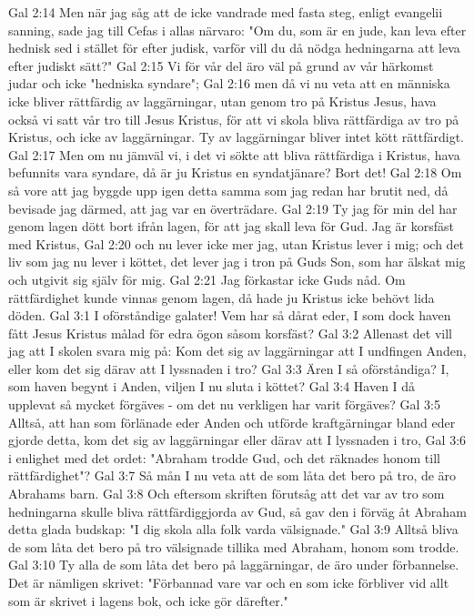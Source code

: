 Gal 2:14  Men när jag såg att de icke vandrade med fasta steg, enligt evangelii sanning, sade jag till Cefas i allas närvaro: "Om du, som är en jude, kan leva efter hednisk sed i stället för efter judisk, varför vill du då nödga hedningarna att leva efter judiskt sätt?"
Gal 2:15  Vi för vår del äro väl på grund av vår härkomst judar och icke "hedniska syndare";
Gal 2:16  men då vi nu veta att en människa icke bliver rättfärdig av laggärningar, utan genom tro på Kristus Jesus, hava också vi satt vår tro till Jesus Kristus, för att vi skola bliva rättfärdiga av tro på Kristus, och icke av laggärningar. Ty av laggärningar bliver intet kött rättfärdigt.
Gal 2:17  Men om nu jämväl vi, i det vi sökte att bliva rättfärdiga i Kristus, hava befunnits vara syndare, då är ju Kristus en syndatjänare? Bort det!
Gal 2:18  Om så vore att jag byggde upp igen detta samma som jag redan har brutit ned, då bevisade jag därmed, att jag var en överträdare.
Gal 2:19  Ty jag för min del har genom lagen dött bort ifrån lagen, för att jag skall leva för Gud. Jag är korsfäst med Kristus,
Gal 2:20  och nu lever icke mer jag, utan Kristus lever i mig; och det liv som jag nu lever i köttet, det lever jag i tron på Guds Son, som har älskat mig och utgivit sig själv för mig.
Gal 2:21  Jag förkastar icke Guds nåd. Om rättfärdighet kunde vinnas genom lagen, då hade ju Kristus icke behövt lida döden.
Gal 3:1  I oförståndige galater! Vem har så dårat eder, I som dock haven fått Jesus Kristus målad för edra ögon såsom korsfäst?
Gal 3:2  Allenast det vill jag att I skolen svara mig på: Kom det sig av laggärningar att I undfingen Anden, eller kom det sig därav att I lyssnaden i tro?
Gal 3:3  Ären I så oförståndiga? I, som haven begynt i Anden, viljen I nu sluta i köttet?
Gal 3:4  Haven I då upplevat så mycket förgäves - om det nu verkligen har varit förgäves?
Gal 3:5  Alltså, att han som förlänade eder Anden och utförde kraftgärningar bland eder gjorde detta, kom det sig av laggärningar eller därav att I lyssnaden i tro,
Gal 3:6  i enlighet med det ordet: "Abraham trodde Gud, och det räknades honom till rättfärdighet"?
Gal 3:7  Så mån I nu veta att de som låta det bero på tro, de äro Abrahams barn.
Gal 3:8  Och eftersom skriften förutsåg att det var av tro som hedningarna skulle bliva rättfärdiggjorda av Gud, så gav den i förväg åt Abraham detta glada budskap: "I dig skola alla folk varda välsignade."
Gal 3:9  Alltså bliva de som låta det bero på tro välsignade tillika med Abraham, honom som trodde.
Gal 3:10  Ty alla de som låta det bero på laggärningar, de äro under förbannelse. Det är nämligen skrivet: "Förbannad vare var och en som icke förbliver vid allt som är skrivet i lagens bok, och icke gör därefter."
